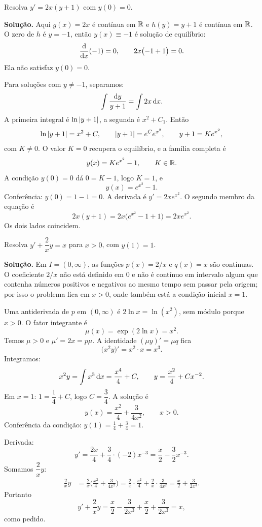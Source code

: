 \documentclass[11pt,a4paper]{article}
\begin{document}
\begin{exercicio}[Intermediário --- I5]
Resolva \(y'=2x(y+1)\) com \(y(0)=0\).
\end{exercicio}

\noindent\textbf{Solução.}
Aqui \(g(x)=2x\) é contínua em \(\mathbb{R}\) e \(h(y)=y+1\) é contínua em \(\mathbb{R}\). O zero de \(h\) é \(y=-1\), então \(y(x)\equiv -1\) é solução de equilíbrio:
\[
\frac{\mathrm{d}}{\mathrm{d} x}(-1)=0,\qquad 2x\bigl(-1+1\bigr)=0.
\]
Ela não satisfaz \(y(0)=0\).

Para soluções com \(y\neq -1\), separamos:
\[
\int\frac{\mathrm{d} y}{y+1}=\int 2x\,\mathrm{d} x.
\]
A primeira integral é \(\ln\left\lvert y+1 \right\rvert\), a segunda é \(x^{2}+C_{1}\). Então
\[
\ln\left\lvert y+1 \right\rvert=x^{2}+C,\qquad
\left\lvert y+1 \right\rvert=e^{C}e^{x^{2}},\qquad
y+1=Ke^{x^{2}},
\]
com \(K\neq 0\). O valor \(K=0\) recupera o equilíbrio, e a família completa é
\[
y(x)=Ke^{x^{2}}-1,\qquad K\in\mathbb{R}.
\]
A condição \(y(0)=0\) dá \(0=K-1\), logo \(K=1\), e
\[
y(x)=e^{x^{2}}-1.
\]
Conferência: \(y(0)=1-1=0\). A derivada é \(y'=2xe^{x^{2}}\). O segundo membro da equação é
\[
2x(y+1)=2x\bigl(e^{x^{2}}-1+1\bigr)=2xe^{x^{2}}.
\]
Os dois lados coincidem.

\begin{exercicio}[Intermediário --- I6]
Resolva \(y'+\dfrac{2}{x}y=x\) para \(x>0\), com \(y(1)=1\).
\end{exercicio}

\noindent\textbf{Solução.}
Em \(I=(0,\infty)\), as funções \(p(x)=2/x\) e \(q(x)=x\) são contínuas. O coeficiente \(2/x\) não está definido em \(0\) e não é contínuo em intervalo algum que contenha números positivos e negativos ao mesmo tempo sem passar pela origem; por isso o problema fica em \(x>0\), onde também está a condição inicial \(x=1\).

Uma antiderivada de \(p\) em \((0,\infty)\) é \(2\ln x=\ln(x^{2})\), sem módulo porque \(x>0\). O fator integrante é
\[
\mu(x)=\exp(2\ln x)=x^{2}.
\]
Temos \(\mu>0\) e \(\mu'=2x=p\mu\). A identidade \((\mu y)'=\mu q\) fica
\[
\bigl(x^{2} y\bigr)'=x^{2}\cdot x=x^{3}.
\]
Integramos:
\[
x^{2} y=\int x^{3}\,\mathrm{d} x=\frac{x^{4}}{4}+C,
\qquad
y=\frac{x^{2}}{4}+Cx^{-2}.
\]
Em \(x=1\): \(1=\dfrac{1}{4}+C\), logo \(C=\dfrac{3}{4}\). A solução é
\[
y(x)=\frac{x^{2}}{4}+\frac{3}{4x^{2}},\qquad x>0.
\]
Conferência da condição: \(y(1)=\frac14+\frac34=1\).

Derivada:
\[
y'=\frac{2x}{4}+\frac{3}{4}\cdot(-2)x^{-3}
=\frac{x}{2}-\frac{3}{2}x^{-3}.
\]
Somamos \(\dfrac{2}{x}y\):
\begin{align*}
\frac{2}{x}y
&=\frac{2}{x}\Biggl(\frac{x^{2}}{4}+\frac{3}{4x^{2}}\Biggr)
=\frac{2}{x}\cdot\frac{x^{2}}{4}+\frac{2}{x}\cdot\frac{3}{4x^{2}}
=\frac{x}{2}+\frac{3}{2x^{3}}.
\end{align*}
Portanto
\[
y'+\frac{2}{x}y
=\frac{x}{2}-\frac{3}{2x^{3}}+\frac{x}{2}+\frac{3}{2x^{3}}
=x,
\]
como pedido.
\end{document}
